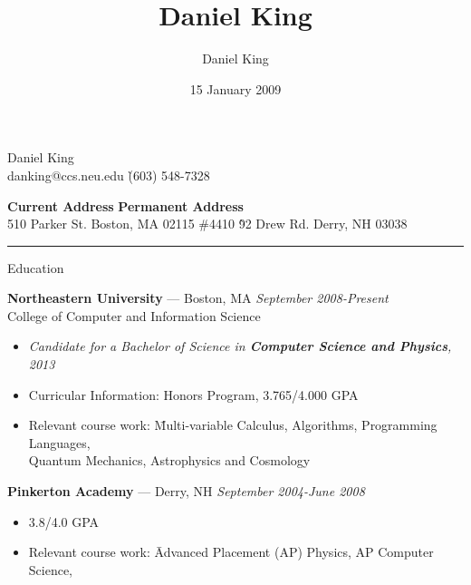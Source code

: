 \documentclass[10pt]{letter}
\author{Daniel King}
\title{Daniel King}
\date{15 January 2009}
\begin{document}
\begin{tabbing}{\Huge Daniel King} \\
\normalsize danking@ccs.neu.edu \`(603) 548-7328
\end{tabbing}

\vspace{-10pt}
\begin{tabbing}
\textbf{Current Address} \`\textbf{Permanent Address}\\
510 Parker St. Boston, MA 02115 \#4410 \`92 Drew Rd. Derry, NH 03038
\end{tabbing}\vspace{-15pt}
\rule{\linewidth}{.5pt}

{\Large Education}
\begin{tabbing}
{\large \bf Northeastern University} --- Boston, MA \` \textit{September 2008-Present} \\
College of Computer and Information Science
\end{tabbing}\vspace{-15pt}

\begin{itemize}
\setlength\itemsep{1pt}
\item[] \textit{Candidate for a Bachelor of Science in \textbf{Computer Science and Physics}, 2013}
\item Curricular Information:\hspace{.355in} Honors Program, 3.765/4.000 GPA
\item \begin{tabbing}Relevant course work:\hspace{.5in} \= Multi-variable Calculus, Algorithms, Programming Languages, \\
  \>Quantum Mechanics, Astrophysics and Cosmology\end{tabbing}
\end{itemize}

\begin{tabbing}
{\large \bf Pinkerton Academy} --- Derry, NH \` \textit{September 2004-June 2008}
\end{tabbing}\vspace{-15pt}
\begin{itemize}
\setlength\itemsep{1pt}
\item 3.8/4.0 GPA
\item \begin{tabbing}Relevant course work:\hspace{.5in} \= Advanced Placement (AP) Physics,
                                                          AP Computer Science,\end{tabbing}
\end{itemize}\vspace{-15pt}
\end{document}
